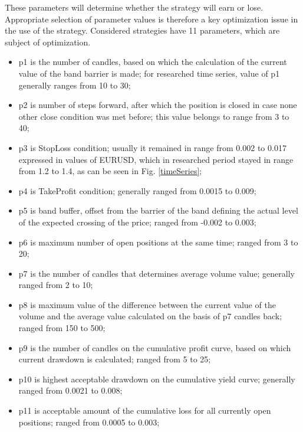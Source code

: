 \documentclass{tewiart}
\begin{document}
These parameters will determine whether the strategy will earn or lose. Appropriate selection of parameter values is therefore a key optimization issue in the use of the strategy. Considered strategies have 11 parameters, which are subject of optimization.
\begin{itemize}
\item p1 is the number of candles, based on which the calculation of the current value of the band barrier is made; for researched time series, value of p1 generally ranges from 10 to 30;
\item p2 is number of steps forward, after which the position is closed in case none other close condition was met before; this value belongs to range from 3 to 40;
\item p3 is StopLoss condition; usually it remained in range from 0.002 to 0.017 expressed in values of EURUSD, which in researched period stayed in range from 1.2 to 1.4, as can be seen in Fig. \ref{timeSeries};
\item p4 is TakeProfit condition; generally ranged from 0.0015 to 0.009;
\item p5 is band buffer, offset from the barrier of the band defining the actual level of the expected crossing of the  price; ranged from -0.002 to 0.003;
\item p6 is maximum number of open positions at the same time; ranged from 3 to 20;
\item p7 is the number of candles that determines average volume value; generally ranged from 2 to 10;
\item p8 is maximum value of the difference between the current value of the volume and the average value calculated on the basis of p7 candles back; ranged from 150 to 500;
\item p9 is the number of candles on the cumulative profit curve, based on which current drawdown is calculated; ranged from 5 to 25;
\item p10 is highest acceptable drawdown on the cumulative yield curve; generally ranged from 0.0021 to 0.008;
\item p11 is acceptable amount of the cumulative loss for all currently open positions; ranged from 0.0005 to 0.003;
\end{itemize}
\end{document}
